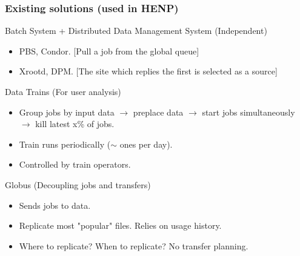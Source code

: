 \documentclass{beamer}
\begin{document}
\begin{frame}\frametitle{Existing solutions (used in HENP)} 	
\begin{block}{Batch System + Distributed Data Management System (Independent)}  
		\begin{itemize}
			\item PBS, Condor. [Pull a job from the global queue]
			\item Xrootd, DPM. [The site which replies the first is selected as a source] 			
		\end{itemize}
 	\end{block} 	
\begin{block}{Data Trains (For user analysis)}	
	 \begin{itemize}
	 \item Group jobs by input data $\longrightarrow$ preplace data $\longrightarrow$ start jobs simultaneously $\longrightarrow$ kill latest x\% of jobs. 
	 \item Train runs periodically ($\sim$ ones per day).  
 	 \item Controlled by train operators. 
 	  \end{itemize}
\end{block}
\begin{block}{Globus (Decoupling jobs and transfers)} 	
\begin{itemize}
 	 \item Sends jobs to data.  
 	 \item Replicate most "popular" files. Relies on usage history.
 	 \item Where to replicate? When to replicate? No transfer planning.
 	 \end{itemize}
\end{block} 	 
\end{frame}
\end{document}
